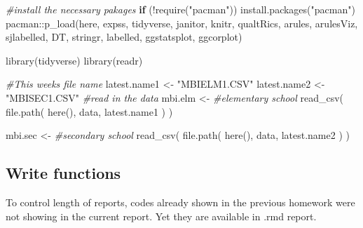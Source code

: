 \documentclass[
]{article}
\newenvironment{Shaded}{\begin{snugshade}}{\end{snugshade}}
\newcommand{\CommentTok}[1]{\textcolor[rgb]{0.56,0.35,0.01}{\textit{#1}}}
\newcommand{\ControlFlowTok}[1]{\textcolor[rgb]{0.13,0.29,0.53}{\textbf{#1}}}
\newcommand{\FunctionTok}[1]{\textcolor[rgb]{0.00,0.00,0.00}{#1}}
\newcommand{\NormalTok}[1]{#1}
\newcommand{\OtherTok}[1]{\textcolor[rgb]{0.56,0.35,0.01}{#1}}
\newcommand{\SpecialCharTok}[1]{\textcolor[rgb]{0.00,0.00,0.00}{#1}}
\newcommand{\StringTok}[1]{\textcolor[rgb]{0.31,0.60,0.02}{#1}}
\begin{document}
\begin{Shaded}
\begin{Highlighting}[]
\CommentTok{\#install the necessary pakages}
\ControlFlowTok{if}\NormalTok{ (}\SpecialCharTok{!}\FunctionTok{require}\NormalTok{(}\StringTok{"pacman"}\NormalTok{)) }\FunctionTok{install.packages}\NormalTok{(}\StringTok{"pacman"}\NormalTok{)}
\NormalTok{pacman}\SpecialCharTok{::}\FunctionTok{p\_load}\NormalTok{(here, }
\NormalTok{               expss, }
\NormalTok{               tidyverse, }
\NormalTok{               janitor,}
\NormalTok{               knitr, }
\NormalTok{               qualtRics, }
\NormalTok{               arules, }
\NormalTok{               arulesViz, }
\NormalTok{               sjlabelled,}
\NormalTok{               DT,}
\NormalTok{               stringr,}
\NormalTok{               labelled,}
\NormalTok{               ggstatsplot,}
\NormalTok{               ggcorplot)}

\FunctionTok{library}\NormalTok{(tidyverse)}
\FunctionTok{library}\NormalTok{(readr)}

\CommentTok{\#This week\textquotesingle{}s file name}
\NormalTok{latest.name1 }\OtherTok{\textless{}{-}} \StringTok{"MBIELM1.CSV"}
\NormalTok{latest.name2 }\OtherTok{\textless{}{-}} \StringTok{"MBISEC1.CSV"}
\CommentTok{\#read in the data}
\NormalTok{mbi.elm }\OtherTok{\textless{}{-}}  \CommentTok{\#elementary school}
  \FunctionTok{read\_csv}\NormalTok{(}
    \FunctionTok{file.path}\NormalTok{(}
      \FunctionTok{here}\NormalTok{(),}
      \StringTok{\textquotesingle{}data\textquotesingle{}}\NormalTok{,}
\NormalTok{      latest.name1}
\NormalTok{      )}
\NormalTok{    )}

\NormalTok{mbi.sec }\OtherTok{\textless{}{-}} \CommentTok{\#secondary school}
  \FunctionTok{read\_csv}\NormalTok{(}
    \FunctionTok{file.path}\NormalTok{(}
      \FunctionTok{here}\NormalTok{(),}
      \StringTok{\textquotesingle{}data\textquotesingle{}}\NormalTok{,}
\NormalTok{      latest.name2}
\NormalTok{      )}
\NormalTok{    )}
\end{Highlighting}
\end{Shaded}

\hypertarget{write-functions}{%
\subsection{Write functions}\label{write-functions}}

To control length of reports, codes already shown in the previous homework were not showing in the current report. Yet they are available in .rmd report.
\end{document}
